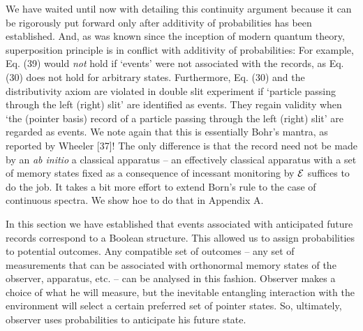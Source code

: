 \documentclass[aps,twocolumn,pra,epsfig]{revtex4}
\begin{document}
We have waited until now with detailing this continuity argument because 
it can be rigorously put forward only after additivity of probabilities has been
established. And, as was known since the inception of modern quantum theory,
superposition principle is in conflict with additivity of probabilities:
For example, Eq. (39) would {\it not} hold if `events' were not associated with
the records, as Eq. (30) does not hold for arbitrary states.  Furthermore,
Eq. (30) and the distributivity axiom are violated in double slit experiment
if `particle passing through the left (right) slit' are identified as events.
They regain validity when `the (pointer basis) record of a particle passing
through the left (right) slit' are regarded as events. We note again that this is
essentially Bohr's mantra, as reported by Wheeler [37]! The only difference
is that the record need not be made by an {\it ab initio} a classical apparatus
-- an effectively classical apparatus with a set of memory states fixed as 
a consequence of incessant monitoring by ${\cal E}$ suffices to do the job.
It takes a bit more effort to extend Born's rule to the case of continuous spectra.
We show hoe to do that in Appendix A.

In this section we have established that events associated with anticipated
future records correspond to a Boolean structure. This allowed us to assign
probabilities to potential outcomes. Any compatible set of outcomes
-- any set of measurements that can be associated with orthonormal memory
states of the observer, apparatus, etc. -- can be analysed in this fashion.
Observer makes a choice of what he will measure, but the inevitable
entangling interaction with the environment will select a certain preferred set
of pointer states. So, ultimately, observer uses probabilities to anticipate
his future state.
\end{document}
